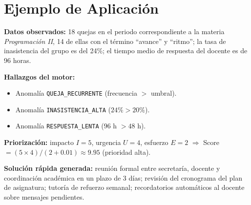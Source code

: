 \section{Ejemplo de Aplicación}

\begin{cajaAlgoritmo}
\textbf{Datos observados:} 18 quejas en el periodo correspondiente a la materia
\textit{Programación II}, 14 de ellas con el término ``avance'' y ``ritmo'';
la tasa de inasistencia del grupo es del 24\%; el tiempo medio de respuesta del
docente es de 96 horas.

\vspace{4pt}
\textbf{Hallazgos del motor:}
\begin{itemize}[leftmargin=1.0cm, itemsep=2pt]
  \item Anomalía \texttt{QUEJA\_RECURRENTE} (frecuencia $>$ umbral).
  \item Anomalía \texttt{INASISTENCIA\_ALTA} ($24\% > 20\%$).
  \item Anomalía \texttt{RESPUESTA\_LENTA} ($96$ h $> 48$ h).
\end{itemize}

\vspace{4pt}
\textbf{Priorización:} impacto $I=5$, urgencia $U=4$, esfuerzo $E=2$
$\Rightarrow$ Score $= (5 \times 4)/(2 + 0.01) \approx 9.95$ (prioridad alta).

\vspace{4pt}
\textbf{Solución rápida generada:} reunión formal entre secretaría, docente y
coordinación académica en un plazo de 3 días; revisión del cronograma del plan
de asignatura; tutoría de refuerzo semanal; recordatorios automáticos al docente
sobre mensajes pendientes.
\end{cajaAlgoritmo}
